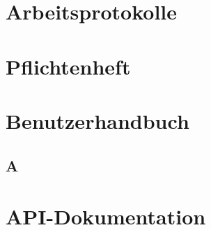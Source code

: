 \cleardoublepage{}
\lstlistoflistings{\thispagestyle{footerOnly}}

\chapter[Arbeitsprotokolle]{Arbeitsprotokolle}

{
\pagestyle{hdrMj}

}

{
\pagestyle{hdrGp}

}

{
\pagestyle{hdrZb}

}

\chapter{Pflichtenheft}


\chapter{Benutzerhandbuch}
\blindtext[1]
\newpage
\section{A}
\blindtext[1]

\chapter{API-Dokumentation}